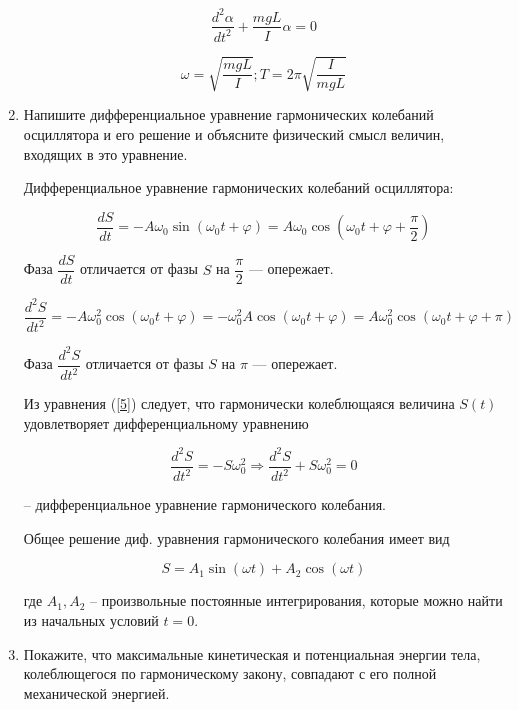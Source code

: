 \documentclass[12pt,a4paper]{article}%
\begin{document}
\begin{enumerate}
	\begin{equation}
	\dfrac{d^2\alpha}{dt^2} + \dfrac{mgL}{I}\alpha = 0
	\end{equation}
	
	\begin{equation}
	\omega = \sqrt{\dfrac{mgL}{I}};     T = 2\pi\sqrt{\dfrac{I}{mgL}}
	\end{equation}
	
	\item Напишите дифференциальное уравнение гармонических колебаний осциллятора и его решение и объясните физический смысл величин, входящих в это уравнение.
	
	Дифференциальное уравнение гармонических колебаний осциллятора:
	
	\begin{equation}
	\dfrac{dS}{dt} = -A\omega_0\sin(\omega_0t+\varphi) = A\omega_0\cos(\omega_0t+\varphi+\dfrac{\pi}{2})
	\end{equation}
	
	Фаза $\dfrac{dS}{dt}$ отличается от фазы $S$ на $\dfrac{\pi}{2}$
	--- опережает.
	
	\begin{equation}
	\dfrac{d^2S}{dt^2} = -A\omega_0^2\cos(\omega_0t+\varphi) = -\omega_0^2A\cos(\omega_0t+\varphi) = A\omega_0^2\cos(\omega_0t+\varphi+\pi)
	\label{5}
	\end{equation}
	
	Фаза $\dfrac{d^2S}{dt^2}$ отличается от фазы $S$ на $\pi$ --- опережает.
	
	Из уравнения (\ref{5})
	следует, что гармонически колеблющаяся
	величина $S(t)$ удовлетворяет
	дифференциальному уравнению
	
	\begin{equation}
	\dfrac{d^2S}{dt^2} = -S\omega_0^2 \Rightarrow \dfrac{d^2S}{dt^2} + S\omega_0^2 = 0
	\end{equation}
	
	– дифференциальное уравнение
	гармонического колебания.
	
	Общее решение диф. уравнения
	гармонического колебания имеет вид
	
	\begin{equation}
	S = A_1\sin(\omega t) + A_2\cos(\omega t)
	\end{equation}
	
	где $A_1
	, A_2$ – произвольные постоянные
	интегрирования, которые можно найти
	из начальных условий $t = 0$. 
	
	\item Покажите, что максимальные кинетическая и потенциальная энергии тела,
	колеблющегося по гармоническому закону, совпадают с его полной механической энергией.
	

\end{enumerate}
\end{document}
